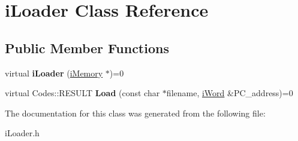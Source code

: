\hypertarget{classiLoader}{
\section{iLoader Class Reference}
\label{classiLoader}
}
\subsection*{Public Member Functions}
\begin{DoxyCompactItemize}
\item 
\hypertarget{classiLoader_af176ab81c798d222d0bd533b0ce902e8}{
virtual {\bfseries iLoader} (\hyperlink{classiMemory}{iMemory} $\ast$)=0}
\label{classiLoader_af176ab81c798d222d0bd533b0ce902e8}

\item 
\hypertarget{classiLoader_abc5e510d785dae098511075bb683b273}{
virtual Codes::RESULT {\bfseries Load} (const char $\ast$filename, \hyperlink{classiWord}{iWord} \&PC\_\-address)=0}
\label{classiLoader_abc5e510d785dae098511075bb683b273}

\end{DoxyCompactItemize}


The documentation for this class was generated from the following file:\begin{DoxyCompactItemize}
\item 
iLoader.h\end{DoxyCompactItemize}
